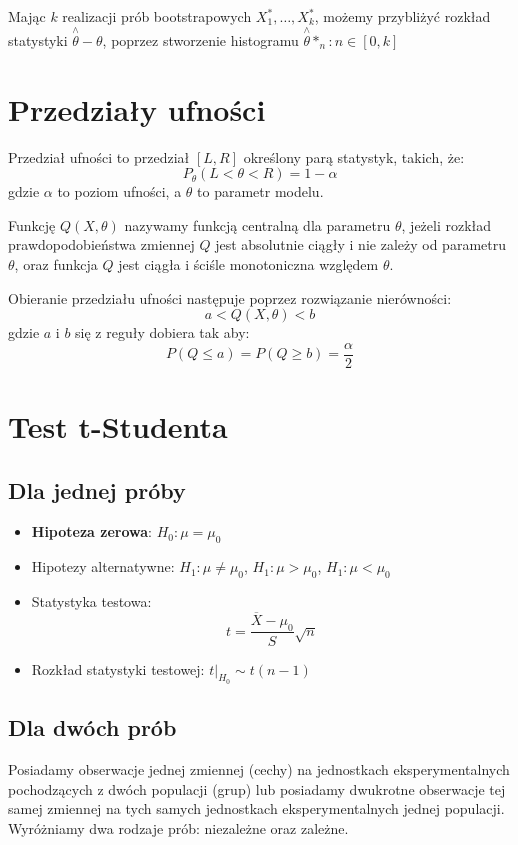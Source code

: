 \documentclass{../notatki}
\begin{document}
Mając $k$ realizacji prób bootstrapowych $X_1^*, \dots, X_k^*$, możemy
przybliżyć rozkład statystyki $\stackrel{\wedge}{\theta} - \theta$, poprzez
stworzenie histogramu $\stackrel{\wedge}{\theta}*_n: n\in [0,k]$

\section{Przedziały ufności}

Przedział ufności to przedział $[L, R]$ określony parą statystyk, takich, że:
$$
P_\theta(L < \theta < R) = 1 - \alpha
$$
gdzie $\alpha$ to poziom ufności, a $\theta$ to parametr modelu.

Funkcję $Q(X, \theta)$ nazywamy funkcją centralną dla parametru $\theta$, jeżeli
rozkład prawdopodobieństwa zmiennej $Q$ jest absolutnie ciągły i nie zależy od
parametru $\theta$, oraz funkcja $Q$ jest ciągła i ściśle monotoniczna względem
$\theta$.

Obieranie przedziału ufności następuje poprzez rozwiązanie nierówności:
$$
a < Q(X, \theta) < b
$$
gdzie $a$ i $b$ się z reguły dobiera tak aby:
$$
P(Q \le a) = P(Q \ge b) = \frac{\alpha}{2}
$$

\section{Test t-Studenta}

\subsection{Dla jednej próby}

\begin{itemize}
  \item \textbf{Hipoteza zerowa}: $H_0: \mu = \mu_0$
  \item Hipotezy alternatywne: $H_1: \mu \neq \mu_0$, $H_1: \mu >
    \mu_0$, $H_1: \mu < \mu_0$
  \item Statystyka testowa:
    $$
    t = \frac{\overline{X} - \mu_0}{S} \sqrt{n}
    $$
  \item Rozkład statystyki testowej: $t|_{H_0} \sim t(n-1)$
\end{itemize}

\subsection{Dla dwóch prób}

Posiadamy obserwacje jednej zmiennej (cechy) na jednostkach
eksperymentalnych pochodzących z dwóch populacji (grup) lub
posiadamy dwukrotne obserwacje tej samej zmiennej na tych samych
jednostkach eksperymentalnych jednej populacji. Wyróżniamy dwa
rodzaje prób: niezależne oraz zależne.
\end{document}

